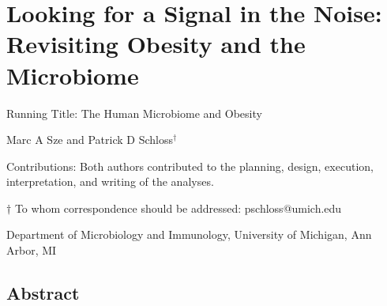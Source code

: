 \documentclass[12pt,]{article}
\title{}
\author{}
\date{}
\begin{document}
\section{Looking for a Signal in the Noise: Revisiting Obesity and the
Microbiome}\label{looking-for-a-signal-in-the-noise-revisiting-obesity-and-the-microbiome}

\begin{center}
\vspace{25mm}


Running Title: The Human Microbiome and Obesity

\vspace{10mm}

Marc A Sze and Patrick D Schloss${^\dagger}$

\vspace{10mm}

Contributions: Both authors contributed to the planning, design, execution, interpretation, and writing of the analyses.


\vspace{20mm}

$\dagger$ To whom correspondence should be addressed: pschloss@umich.edu

Department of Microbiology and Immunology, University of Michigan, Ann Arbor, MI
\end{center}

\newpage

\linenumbers

\subsection{Abstract}\label{abstract}
\end{document}
